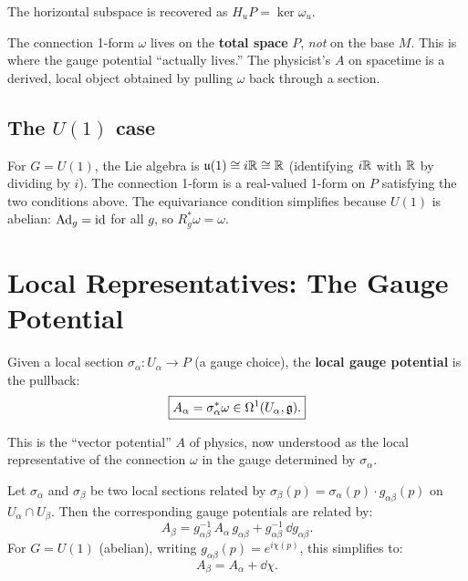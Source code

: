 The horizontal subspace is recovered as $H_u P = \ker\omega_u$.

\begin{remark}
The connection 1-form $\omega$ lives on the \textbf{total space} $P$, \emph{not} on the base $M$. This is where the gauge potential ``actually lives.'' The physicist's $A$ on spacetime is a derived, local object obtained by pulling $\omega$ back through a section.
\end{remark}

\subsection{The $U(1)$ case}

For $G = U(1)$, the Lie algebra is $\mathfrak{u}(1) \cong i\mathbb{R} \cong \mathbb{R}$ (identifying $i\mathbb{R}$ with $\mathbb{R}$ by dividing by $i$). The connection 1-form is a real-valued 1-form on $P$ satisfying the two conditions above. The equivariance condition simplifies because $U(1)$ is abelian: $\mathrm{Ad}_g = \mathrm{id}$ for all $g$, so $R_g^*\omega = \omega$.

\section{Local Representatives: The Gauge Potential}

\begin{definition}
Given a local section $\sigma_\alpha: U_\alpha \to P$ (a gauge choice), the \textbf{local gauge potential} is the pullback:
\begin{equation}
\boxed{A_\alpha = \sigma_\alpha^*\omega \in \Omega^1(U_\alpha, \mathfrak{g}).}
\end{equation}
\end{definition}

This is the ``vector potential'' $A$ of physics, now understood as the local representative of the connection $\omega$ in the gauge determined by $\sigma_\alpha$.

\begin{theorem}
Let $\sigma_\alpha$ and $\sigma_\beta$ be two local sections related by $\sigma_\beta(p) = \sigma_\alpha(p) \cdot g_{\alpha\beta}(p)$ on $U_\alpha \cap U_\beta$. Then the corresponding gauge potentials are related by:
\begin{equation}
\boxed{A_\beta = g_{\alpha\beta}^{-1}\,A_\alpha\,g_{\alpha\beta} + g_{\alpha\beta}^{-1}\,\dd g_{\alpha\beta}.}
\end{equation}
For $G = U(1)$ (abelian), writing $g_{\alpha\beta}(p) = e^{i\chi(p)}$, this simplifies to:
\begin{equation}
A_\beta = A_\alpha + \dd\chi.
\end{equation}
\end{theorem}

